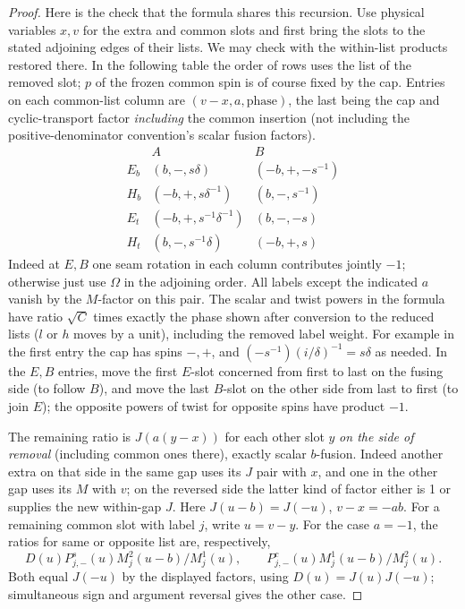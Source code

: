 \begin{proof}
Here is the check that the formula shares this recursion. Use physical variables \(x,v\) for the extra and common slots and first bring the slots to the stated adjoining edges of their lists. We may check with the within-list products restored there. In the following table the order of rows uses the list of the removed slot; \(p\) of the frozen common spin is of course fixed by the cap. Entries on each common-list column are \((v-x,a,\text{phase})\), the last being the cap and cyclic-transport factor \emph{including} the common insertion (not including the positive-denominator convention's scalar fusion factors).
\[
\begin{array}{c|cc}
 & A&B\\\hline
 E_b &(b,-,s\delta)&(-b,+,-s^{-1})\\
 H_b &(-b,+,s\delta^{-1})&(b,-,s^{-1})\\
 E_t &(-b,+,s^{-1}\delta^{-1})&(b,-,-s)\\
 H_t &(b,-,s^{-1}\delta)&(-b,+,s)
\end{array}
\]
Indeed at \(E,B\) one seam rotation in each column contributes jointly \(-1\); otherwise just use \(\Omega\) in the adjoining order. All labels except the indicated \(a\) vanish by the \(M\)-factor on this pair. The scalar and twist powers in the formula have ratio \(\sqrt C\) times exactly the phase shown after conversion to the reduced lists (\(l\) or \(h\) moves by a unit), including the removed label weight. For example in the first entry the cap has spins \(-,+\), and \((-s^{-1})(i/\delta)^{-1}=s\delta\) as needed. In the \(E,B\) entries, move the first \(E\)-slot concerned from first to last on the fusing side (to follow \(B\)), and move the last \(B\)-slot on the other side from last to first (to join \(E\)); the opposite powers of twist for opposite spins have product \(-1\).

The remaining ratio is \(J(a(y-x))\) for each other slot \(y\) \emph{on the side of removal} (including common ones there), exactly scalar \(b\)-fusion. Indeed another extra on that side in the same gap uses its \(J\) pair with \(x\), and one in the other gap uses its \(M\) with \(v\); on the reversed side the latter kind of factor either is 1 or supplies the new within-gap \(J\). Here \(J(u-b)=J(-u)\), \(v-x=-a b\). For a remaining common slot with label \(j\), write \(u=v-y\). For the case \(a=-1\), the ratios for same or opposite list are, respectively,
\[
 D(u)P^{s}_{j,-}(u) M^2_j(u-b)/M^1_j(u),\qquad
 P^c_{j,-}(u) M^1_j(u-b)/M^2_j(u).
\]
Both equal \(J(-u)\) by the displayed factors, using \(D(u)=J(u)J(-u)\); simultaneous sign and argument reversal gives the other case.


\end{proof}
